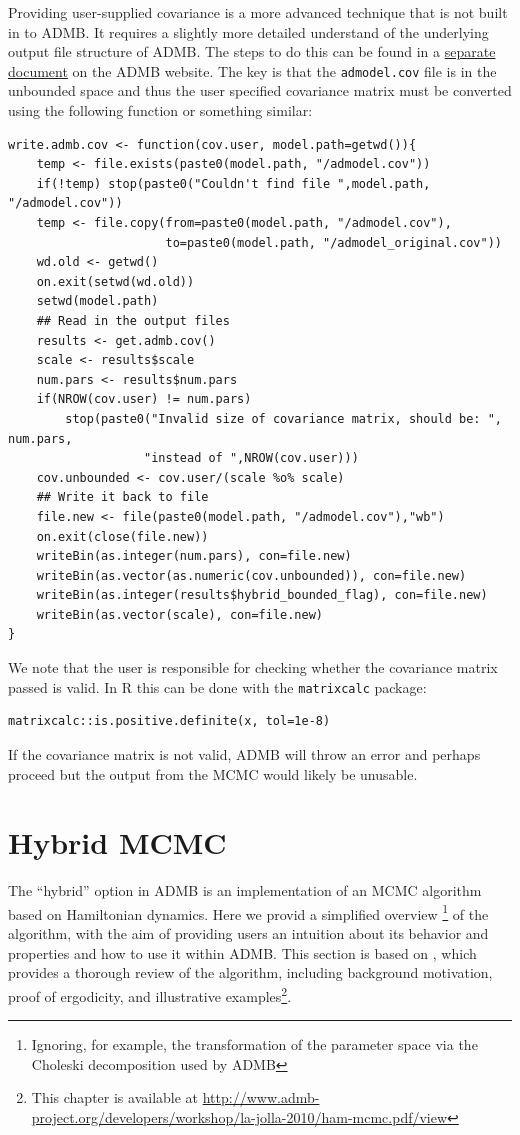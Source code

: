 \documentclass{article}\usepackage[]{graphicx}\usepackage[]{color}
\begin{document}
Providing user-supplied covariance is a more advanced
technique that is not built in to ADMB. It requires a
slightly more detailed understand of the underlying output
file structure of ADMB. The steps to do this can be found in
a
\href{http://www.admb-project.org/examples/admb-tricks/covariance-calculations}{separate
  document} on the ADMB website.  The key is that the
\texttt{admodel.cov} file is in the unbounded space and thus
the user specified covariance matrix must be converted using
the following function or something similar:
\begin{verbatim}
write.admb.cov <- function(cov.user, model.path=getwd()){
    temp <- file.exists(paste0(model.path, "/admodel.cov"))
    if(!temp) stop(paste0("Couldn't find file ",model.path, "/admodel.cov"))
    temp <- file.copy(from=paste0(model.path, "/admodel.cov"),
                      to=paste0(model.path, "/admodel_original.cov"))
    wd.old <- getwd()
    on.exit(setwd(wd.old))
    setwd(model.path)
    ## Read in the output files
    results <- get.admb.cov()
    scale <- results$scale
    num.pars <- results$num.pars
    if(NROW(cov.user) != num.pars)
        stop(paste0("Invalid size of covariance matrix, should be: ", num.pars,
                   "instead of ",NROW(cov.user)))
    cov.unbounded <- cov.user/(scale %o% scale)
    ## Write it back to file
    file.new <- file(paste0(model.path, "/admodel.cov"),"wb")
    on.exit(close(file.new))
    writeBin(as.integer(num.pars), con=file.new)
    writeBin(as.vector(as.numeric(cov.unbounded)), con=file.new)
    writeBin(as.integer(results$hybrid_bounded_flag), con=file.new)
    writeBin(as.vector(scale), con=file.new)
}
\end{verbatim}

We note that the user is responsible for checking whether
the covariance matrix passed is valid. In R this can be done
with the \texttt{matrixcalc} package:
\begin{verbatim}
matrixcalc::is.positive.definite(x, tol=1e-8)
\end{verbatim}
If the covariance matrix is not valid, ADMB will throw an
error and perhaps proceed but the output from the MCMC would
likely be unusable.
\section{Hybrid MCMC}\label{sec:hybrid}
The ``hybrid'' option in ADMB is an implementation of an
MCMC algorithm based on Hamiltonian dynamics. Here we provid
a simplified overview \footnote{Ignoring, for example, the
  transformation of the parameter space via the Choleski
  decomposition used by ADMB} of the algorithm, with the aim
of providing users an intuition about its behavior and
properties and how to use it within ADMB. This section is
based on \cite{brooks2011}, which provides a thorough review
of the algorithm, including background motivation, proof of
ergodicity, and illustrative examples\footnote{This chapter
  is available at
  \url{http://www.admb-project.org/developers/workshop/la-jolla-2010/ham-mcmc.pdf/view}}.
\end{document}
